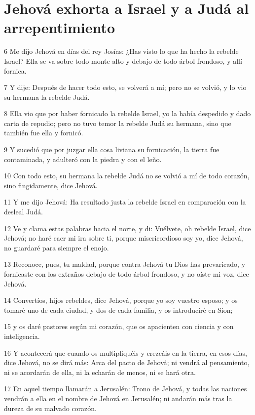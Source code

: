 \section*{Jehová exhorta a Israel y a Judá al arrepentimiento}

\par 6 Me dijo Jehová en días del rey Josías: ¿Has visto lo que ha hecho la rebelde Israel? Ella se va sobre todo monte alto y debajo de todo árbol frondoso, y allí fornica.
\par 7 Y dije: Después de hacer todo esto, se volverá a mí; pero no se volvió, y lo vio su hermana la rebelde Judá.
\par 8 Ella vio que por haber fornicado la rebelde Israel, yo la había despedido y dado carta de repudio; pero no tuvo temor la rebelde Judá su hermana, sino que también fue ella y fornicó.
\par 9 Y sucedió que por juzgar ella cosa liviana su fornicación, la tierra fue contaminada, y adulteró con la piedra y con el leño.
\par 10 Con todo esto, su hermana la rebelde Judá no se volvió a mí de todo corazón, sino fingidamente, dice Jehová.
\par 11 Y me dijo Jehová: Ha resultado justa la rebelde Israel en comparación con la desleal Judá.
\par 12 Ve y clama estas palabras hacia el norte, y di: Vuélvete, oh rebelde Israel, dice Jehová; no haré caer mi ira sobre ti, porque misericordioso soy yo, dice Jehová, no guardaré para siempre el enojo.
\par 13 Reconoce, pues, tu maldad, porque contra Jehová tu Dios has prevaricado, y fornicaste con los extraños debajo de todo árbol frondoso, y no oíste mi voz, dice Jehová.
\par 14 Convertíos, hijos rebeldes, dice Jehová, porque yo soy vuestro esposo; y os tomaré uno de cada ciudad, y dos de cada familia, y os introduciré en Sion;
\par 15 y os daré pastores según mi corazón, que os apacienten con ciencia y con inteligencia.
\par 16 Y acontecerá que cuando os multipliquéis y crezcáis en la tierra, en esos días, dice Jehová, no se dirá más: Arca del pacto de Jehová; ni vendrá al pensamiento, ni se acordarán de ella, ni la echarán de menos, ni se hará otra.
\par 17 En aquel tiempo llamarán a Jerusalén: Trono de Jehová, y todas las naciones vendrán a ella en el nombre de Jehová en Jerusalén; ni andarán más tras la dureza de su malvado corazón.
